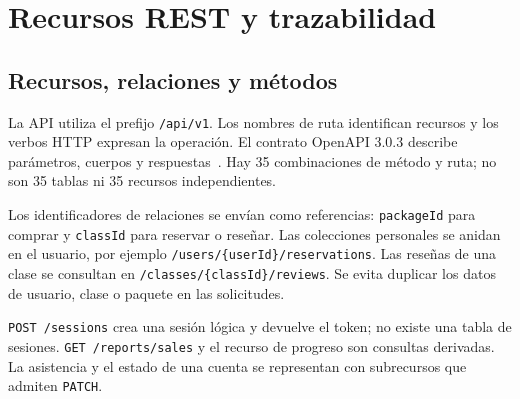 \section{Recursos REST y trazabilidad}\label{sec:rest-laura}
\subsection{Recursos, relaciones y métodos}
La API utiliza el prefijo \texttt{/api/v1}. Los nombres de ruta identifican recursos y los verbos HTTP expresan la operación. El contrato OpenAPI 3.0.3 describe parámetros, cuerpos y respuestas~\cite{openapi}. Hay 35 combinaciones de método y ruta; no son 35 tablas ni 35 recursos independientes.

Los identificadores de relaciones se envían como referencias: \texttt{packageId} para comprar y \texttt{classId} para reservar o reseñar. Las colecciones personales se anidan en el usuario, por ejemplo \texttt{/users/\{userId\}/reservations}. Las reseñas de una clase se consultan en \texttt{/classes/\{classId\}/reviews}. Se evita duplicar los datos de usuario, clase o paquete en las solicitudes.

\texttt{POST /sessions} crea una sesión lógica y devuelve el token; no existe una tabla de sesiones. \texttt{GET /reports/sales} y el recurso de progreso son consultas derivadas. La asistencia y el estado de una cuenta se representan con subrecursos que admiten \texttt{PATCH}.

